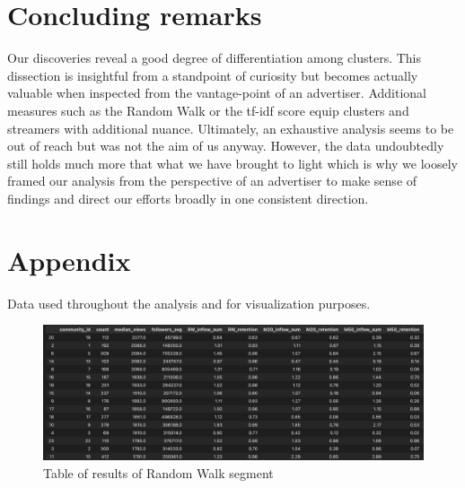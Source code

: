 \documentclass[11pt, oneside]{article}   	%
\begin{document}
\section{Concluding remarks}
Our discoveries reveal a good degree of differentiation among clusters. This dissection is insightful from a standpoint of curiosity but becomes actually valuable when inspected from the vantage-point of an advertiser.
Additional measures such as the Random Walk or the tf-idf score equip clusters and streamers with additional nuance.
Ultimately, an exhaustive analysis seems to be out of reach but was not the aim of us anyway. However, the data undoubtedly still holds much more that what we have brought to light which is why we loosely framed our analysis from the perspective of an advertiser to make sense of findings and direct our efforts broadly in one consistent direction.
\clearpage

\section{Appendix}
Data used throughout the analysis and for visualization purposes.
\begin{figure}[H]
\centering
	\includegraphics[width=1\linewidth]{reportImages/Yavuz_table.png}
\caption{Table of results of Random Walk segment}
\label{figure label}
\end{figure}
\end{document}
